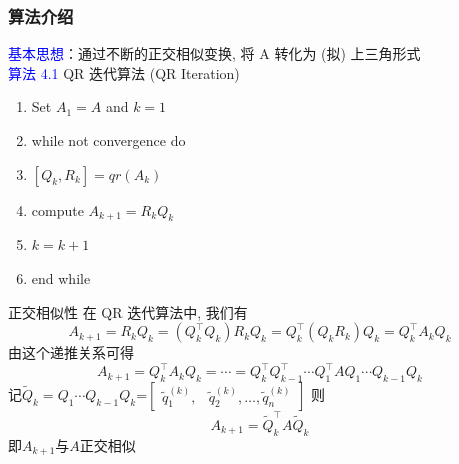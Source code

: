 \documentclass[12pt,a4paper]{article}
\begin{document}
\subsubsection{算法介绍}
\noindent \textcolor{blue}{基本思想}：通过不断的正交相似变换, 将 A 转化为 (拟) 上三角形式\\
\textcolor{blue}{算法 4.1} QR 迭代算法 (QR Iteration)\\
\begin{enumerate}[1:]
	\item Set $A_{1}=A$ and $k=1$
	\item while not convergence do
	\item \qquad $[Q_{k},R_{k}]=qr(A_{k})$
	\item \qquad compute $A_{k+1}=R_{k}Q_{k}$
	\item \qquad$k=k+1$
	\item end while
\end{enumerate}
正交相似性
在 QR 迭代算法中, 我们有
$$
A_{k+1}=R_{k} Q_{k}=\left(Q_{k}^{\top} Q_{k}\right) R_{k} Q_{k}=Q_{k}^{\top}\left(Q_{k} R_{k}\right) Q_{k}=Q_{k}^{\top} A_{k} Q_{k}
$$
由这个递推关系可得
$$
A_{k+1}=Q_{k}^{\top} A_{k} Q_{k}=\cdots=Q_{k}^{\top} Q_{k-1}^{\top} \cdots Q_{1}^{\top} A Q_{1} \cdots Q_{k-1} Q_{k}
$$
记$\tilde{Q}_{k}=Q_{1} \cdots Q_{k-1} Q_{k}$=$\left[\begin{array}{ll}{\tilde{q}_{1}^{(k)},} & {\tilde{q}_{2}^{(k)}, \ldots, \tilde{q}_{n}^{(k)}}\end{array}\right]$
则
\begin{equation} 
A_{k+1}=\tilde{Q}_{k}^{\top} A \tilde{Q}_{k}
\end{equation}
即$A_{k+1}$与$A$正交相似
\end{document}
